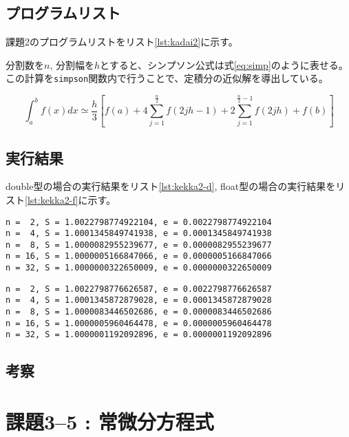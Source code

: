\documentclass[a4j,titlepage]{jsarticle}
\begin{document}
\subsection{プログラムリスト}
課題2のプログラムリストをリスト\ref{lst:kadai2}に示す。

分割数を$n$, 分割幅を$h$とすると、シンプソン公式は式\ref{eq:simp}のように表せる。
この計算を\texttt{simpson}関数内で行うことで、定積分の近似解を導出している。

\begin{equation}
  \int_a^b f(x) dx \simeq \frac{h}{3} \left[ f(a) + 4 \sum_{j=1}^\frac{n}{2} f(2jh - 1)
  + 2 \sum_{j=1}^{\frac{n}{2}-1} f(2jh) + f(b) \right]
  \label{eq:simp}
\end{equation}



\subsection{実行結果}
double型の場合の実行結果をリスト\ref{lst:kekka2-d}, float型の場合の実行結果をリスト\ref{lst:kekka2-f}に示す。

\begin{lstlisting}[style=text,caption=課題2の実行結果（double型の場合）,label=lst:kekka2-d]
n =  2, S = 1.0022798774922104, e = 0.0022798774922104
n =  4, S = 1.0001345849741938, e = 0.0001345849741938
n =  8, S = 1.0000082955239677, e = 0.0000082955239677
n = 16, S = 1.0000005166847066, e = 0.0000005166847066
n = 32, S = 1.0000000322650009, e = 0.0000000322650009
\end{lstlisting}

\begin{lstlisting}[style=text,caption=課題2の実行結果（float型の場合）,label=lst:kekka2-f]
n =  2, S = 1.0022798776626587, e = 0.0022798776626587
n =  4, S = 1.0001345872879028, e = 0.0001345872879028
n =  8, S = 1.0000083446502686, e = 0.0000083446502686
n = 16, S = 1.0000005960464478, e = 0.0000005960464478
n = 32, S = 1.0000001192092896, e = 0.0000001192092896
\end{lstlisting}

\subsection{考察}


\section{課題3--5 : 常微分方程式}
\end{document}
